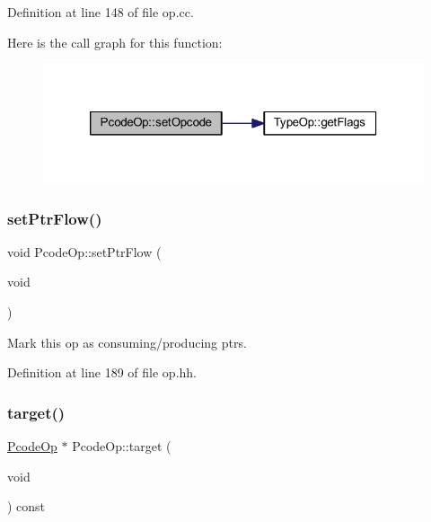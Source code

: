 Definition at line 148 of file op.\+cc.

Here is the call graph for this function\+:
\nopagebreak
\begin{figure}[H]
\begin{center}
\leavevmode
\includegraphics[width=320pt]{class_pcode_op_a2a7f9232bab2d185644c3dd0d536ff1b_cgraph}
\end{center}
\end{figure}
\mbox{\label{class_pcode_op_aad11df3624f33a1d6ffa2e8a82f3868b}} 
\subsubsection{\texorpdfstring{setPtrFlow()}{setPtrFlow()}}
{\footnotesize\ttfamily void Pcode\+Op\+::set\+Ptr\+Flow (\begin{DoxyParamCaption}\item[{void}]{ }\end{DoxyParamCaption})\hspace{0.3cm}{\ttfamily [inline]}}



Mark this op as consuming/producing ptrs. 



Definition at line 189 of file op.\+hh.

\mbox{\label{class_pcode_op_a18784de8c95d9011522302a8ba3647b3}} 
\subsubsection{\texorpdfstring{target()}{target()}}
{\footnotesize\ttfamily \mbox{\hyperlink{class_pcode_op}{Pcode\+Op}} $\ast$ Pcode\+Op\+::target (\begin{DoxyParamCaption}\item[{void}]{ }\end{DoxyParamCaption}) const}



